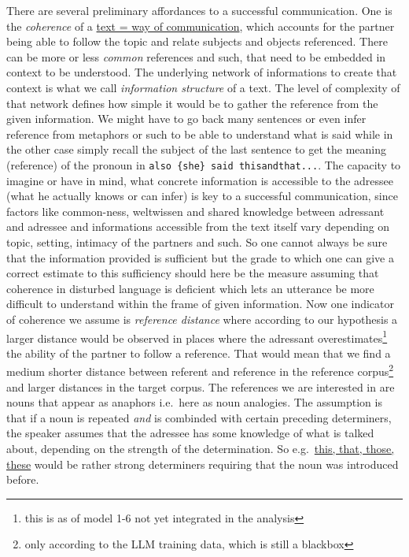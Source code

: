 \documentclass[
  12pt,
  oneside]{book}
\begin{document}
There are several preliminary affordances to a successful communication. One is the \emph{coherence} of a \href{}{text = way of communication}, which accounts for the partner being able to follow the topic and relate subjects and objects referenced. There can be more or less \emph{common} references and such, that need to be embedded in context to be understood. The underlying network of informations to create that context is what we call \emph{information structure} of a text. The level of complexity of that network defines how simple it would be to gather the reference from the given information. We might have to go back many sentences or even infer reference from metaphors or such to be able to understand what is said while in the other case simply recall the subject of the last sentence to get the meaning (reference) of the pronoun in \texttt{also\ \{she\}\ said\ thisandthat...}.
The capacity to imagine or have in mind, what concrete information is accessible to the adressee (what he actually knows or can infer) is key to a successful communication, since factors like common-ness, weltwissen and shared knowledge between adressant and adressee and informations accessible from the text itself vary depending on topic, setting, intimacy of the partners and such. So one cannot always be sure that the information provided is sufficient but the grade to which one can give a correct estimate to this sufficiency should here be the measure assuming that coherence in disturbed language is deficient which lets an utterance be more difficult to understand within the frame of given information.
Now one indicator of coherence we assume is \emph{reference distance} where according to our hypothesis a larger distance would be observed in places where the adressant overestimates\footnote{this is as of model 1-6 not yet integrated in the analysis} the ability of the partner to follow a reference. That would mean that we find a medium shorter distance between referent and reference in the reference corpus\footnote{only according to the LLM training data, which is still a blackbox} and larger distances in the target corpus. The references we are interested in are nouns that appear as anaphors i.e.~here as noun analogies. The assumption is that if a noun is repeated \emph{and} is combinded with certain preceding determiners, the speaker assumes that the adressee has some knowledge of what is talked about, depending on the strength of the determination. So e.g.~\href{}{this, that, those, these} would be rather strong determiners requiring that the noun was introduced before.
\end{document}

